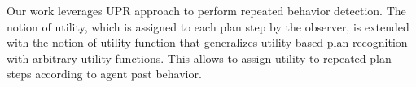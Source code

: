 Our work leverages UPR approach to perform repeated behavior detection. The notion of utility, which is assigned to each plan step by the observer, is extended with the notion of utility function that generalizes utility-based plan recognition with arbitrary utility functions. This allows to assign utility to repeated plan steps according to agent past behavior. 


%
%


